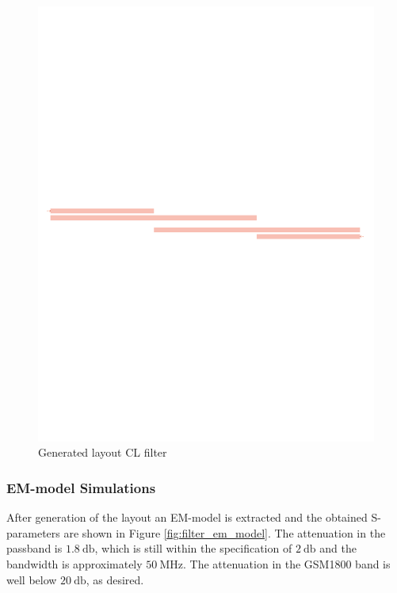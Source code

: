\documentclass[a4paper]{article}        %
\begin{document}
			\begin{figure}[H]
			\centering
				\includegraphics[width=\textwidth]{fig/Filter/2nd_order/layout.pdf}
				\caption{Generated layout CL filter}
				\label{fig:filter_layout}
			\end{figure}
		
		\subsubsection{EM-model Simulations}
			After generation of the layout an EM-model is extracted and the obtained S-parameters are shown in Figure \ref{fig:filter_em_model}. The attenuation in the passband is $\SI{1.8}{\decibel}$, which is still within the specification of $\SI{2}{\decibel}$ and the bandwidth is approximately $\SI{50}{\mega\hertz}$. The attenuation in the GSM1800 band is well below $\SI{20}{\decibel}$, as desired. 
\end{document}
